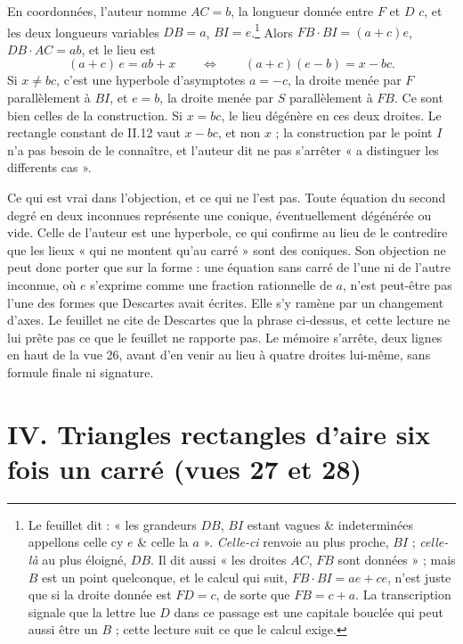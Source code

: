 \documentclass[11pt,a4paper]{article}
\begin{document}
En coordonnées, l'auteur nomme \(AC=b\), la longueur donnée entre \(F\) et
\(D\) \(c\), et les deux longueurs variables \(DB=a\), \(BI=e\).\footnote{Le
feuillet dit : « les grandeurs \(DB\), \(BI\) estant vagues \& indeterminées
appellons celle cy \(e\) \& celle la \(a\) ». \emph{Celle-ci} renvoie au plus
proche, \(BI\) ; \emph{celle-là} au plus éloigné, \(DB\). Il dit aussi « les
droites \(AC\), \(FB\) sont données » ; mais \(B\) est un point quelconque, et
le calcul qui suit, \(FB\cdot BI=ae+ce\), n'est juste que si la droite donnée
est \(FD=c\), de sorte que \(FB=c+a\). La transcription signale que la lettre
lue \(D\) dans ce passage est une capitale bouclée qui peut aussi être un
\(B\) ; cette lecture suit ce que le calcul exige.} Alors \(FB\cdot BI=(a+c)e\),
\(DB\cdot AC=ab\), et le lieu est
\[
(a+c)\,e=ab+x
\qquad\Longleftrightarrow\qquad
(a+c)(e-b)=x-bc .
\]
Si \(x\neq bc\), c'est une hyperbole d'asymptotes \(a=-c\), la droite menée par
\(F\) parallèlement à \(BI\), et \(e=b\), la droite menée par \(S\) parallèlement
à \(FB\). Ce sont bien celles de la construction. Si \(x=bc\), le lieu dégénère
en ces deux droites. Le rectangle constant de II.12 vaut \(x-bc\), et non
\(x\) ; la construction par le point \(I\) n'a pas besoin de le connaître, et
l'auteur dit ne pas s'arrêter « a distinguer les differents cas ».

Ce qui est vrai dans l'objection, et ce qui ne l'est pas. Toute équation du
second degré en deux inconnues représente une conique, éventuellement
dégénérée ou vide. Celle de l'auteur est une hyperbole, ce qui confirme au lieu de le
contredire que les lieux « qui ne montent qu'au carré » sont des coniques. Son
objection ne peut donc porter que sur la forme : une équation sans carré de
l'une ni de l'autre inconnue, où \(e\) s'exprime comme une fraction
rationnelle de \(a\), n'est peut-être pas l'une des formes que Descartes avait
écrites. Elle s'y ramène par un changement d'axes. Le feuillet ne cite de
Descartes que la phrase ci-dessus, et cette lecture ne lui prête pas ce que le
feuillet ne rapporte pas. Le mémoire s'arrête, deux lignes en haut de la vue
26, avant d'en venir au lieu à quatre droites lui-même, sans formule finale ni
signature.

\section*{IV. Triangles rectangles d'aire six fois un carré (vues 27 et 28)}
\end{document}
